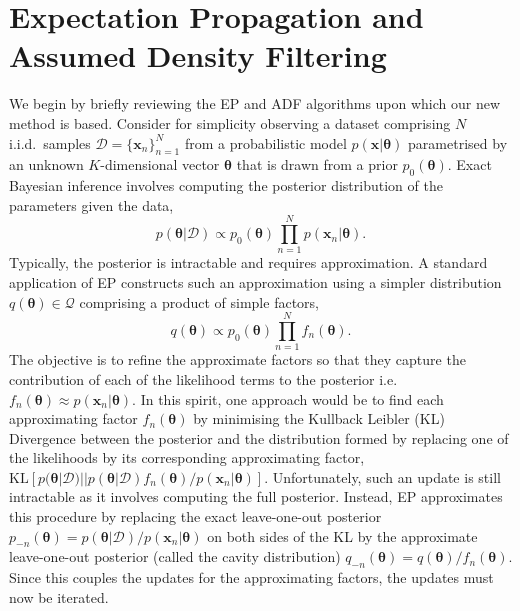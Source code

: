 

\section{Expectation Propagation and Assumed Density Filtering}
We begin by briefly reviewing the EP and ADF algorithms upon which our new method is based. Consider for simplicity observing a dataset comprising $N$ i.i.d.~samples $\mathcal{D} = \{\bm{x}_n \}_{n=1}^N$ from a probabilistic model $p(\bm{x}|\bm{\theta})$ parametrised by an unknown $K$-dimensional vector $\bm{\theta}$ that is drawn from a prior $p_0(\bm{\theta})$. Exact Bayesian inference involves computing the posterior distribution of the parameters given the data, 
\begin{equation}
p(\bm{\theta} | \mathcal{D}) \propto p_0(\bm{\theta}) \prod_{n=1}^{N} p(\bm{x}_n | \bm{\theta}).
\end{equation}
%
Typically, the posterior is intractable and requires approximation. A standard application of EP constructs such an approximation using a simpler distribution $q(\bm{\theta}) \in \mathcal{Q}$ comprising a product of simple factors,
%
%
\begin{equation}
q(\bm{\theta}) \propto p_0(\bm{\theta}) \prod_{n=1}^{N} f_n(\bm{\theta}).
\end{equation}
%
The objective is to refine the approximate factors so that they capture the contribution of each of the likelihood terms to the posterior i.e.~$f_n(\bm{\theta}) \approx p(\bm{x}_n | \bm{\theta})$. In this spirit, one approach would be to find each approximating factor $f_n(\bm{\theta})$ by minimising the Kullback Leibler (KL) Divergence between the posterior and the distribution formed by replacing one of the likelihoods by its corresponding approximating factor,  $\mathrm{KL}[p(\bm{\theta}|\mathcal{D}) || p(\bm{\theta}|\mathcal{D}) f_n(\bm{\theta})/ p(\bm{x}_n | \bm{\theta})]$. Unfortunately, such an update is still intractable as it involves computing the full posterior. Instead, EP approximates this procedure by replacing the exact leave-one-out posterior $p_{-n}(\bm{\theta}) = p(\bm{\theta}|\mathcal{D}) / p(\bm{x}_n | \bm{\theta})$ on both sides of the KL by the approximate leave-one-out posterior (called the cavity distribution) $q_{-n}(\bm{\theta}) =q(\bm{\theta})/f_n(\bm{\theta})$. Since this couples the updates for the approximating factors, the updates must now be iterated.

